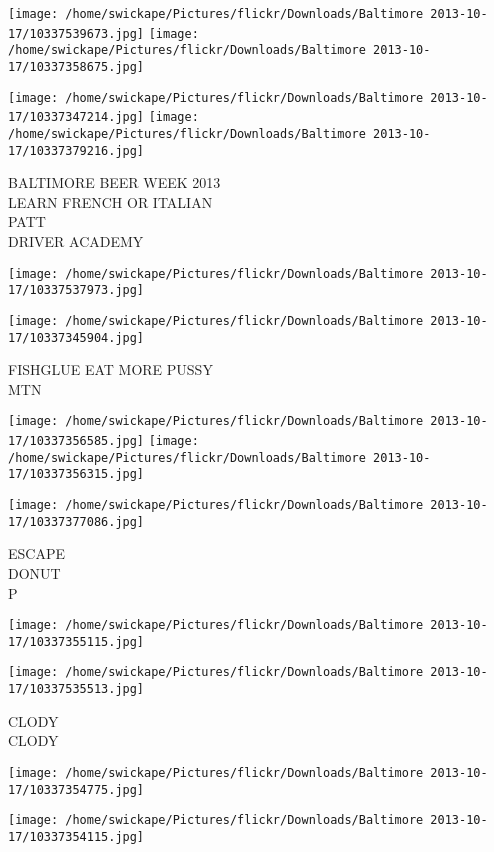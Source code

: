 \documentclass[10pt,letterpaper]{article}
\begin{document}
\texttt{[image: /home/swickape/Pictures/flickr/Downloads/Baltimore 2013-10-17/10337539673.jpg]}
\texttt{[image: /home/swickape/Pictures/flickr/Downloads/Baltimore 2013-10-17/10337358675.jpg]}

\texttt{[image: /home/swickape/Pictures/flickr/Downloads/Baltimore 2013-10-17/10337347214.jpg]}
\texttt{[image: /home/swickape/Pictures/flickr/Downloads/Baltimore 2013-10-17/10337379216.jpg]}

BALTIMORE BEER WEEK 2013\\
LEARN FRENCH OR ITALIAN\\
PATT\\
DRIVER ACADEMY
\pagebreak

\texttt{[image: /home/swickape/Pictures/flickr/Downloads/Baltimore 2013-10-17/10337537973.jpg]}

\vspace{0.25in}
\texttt{[image: /home/swickape/Pictures/flickr/Downloads/Baltimore 2013-10-17/10337345904.jpg]}

FISHGLUE EAT MORE PUSSY\\
MTN
\pagebreak

\texttt{[image: /home/swickape/Pictures/flickr/Downloads/Baltimore 2013-10-17/10337356585.jpg]}
\texttt{[image: /home/swickape/Pictures/flickr/Downloads/Baltimore 2013-10-17/10337356315.jpg]}

\vspace{0.25in}
\texttt{[image: /home/swickape/Pictures/flickr/Downloads/Baltimore 2013-10-17/10337377086.jpg]}

ESCAPE\\
DONUT\\
P
\pagebreak

\texttt{[image: /home/swickape/Pictures/flickr/Downloads/Baltimore 2013-10-17/10337355115.jpg]}

\vspace{0.25in}
\texttt{[image: /home/swickape/Pictures/flickr/Downloads/Baltimore 2013-10-17/10337535513.jpg]}

CLODY\\
CLODY
\pagebreak

\texttt{[image: /home/swickape/Pictures/flickr/Downloads/Baltimore 2013-10-17/10337354775.jpg]}

\vspace{0.25in}
\texttt{[image: /home/swickape/Pictures/flickr/Downloads/Baltimore 2013-10-17/10337354115.jpg]}
\end{document}
